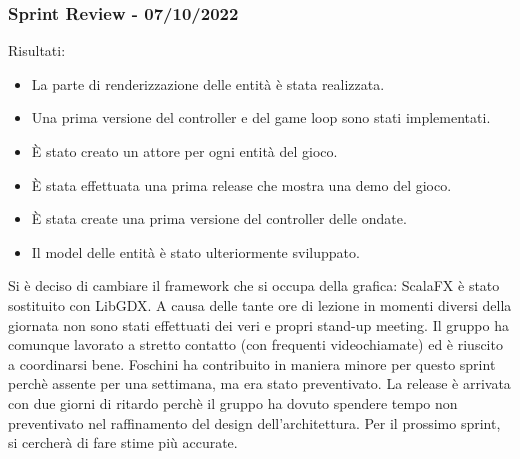 \subsubsection{Sprint Review - 07/10/2022}
Risultati:
\begin{itemize}
  \item La parte di renderizzazione delle entità è stata realizzata.
  \item Una prima versione del controller e del game loop sono stati implementati.
  \item È stato creato un attore per ogni entità del gioco.
  \item È stata effettuata una prima release che mostra una demo del gioco.
  \item È stata create una prima versione del controller delle ondate.
  \item Il model delle entità è stato ulteriormente sviluppato.
\end{itemize}

Si è deciso di cambiare il framework che si occupa della grafica: ScalaFX è stato sostituito con LibGDX.
A causa delle tante ore di lezione in momenti diversi della giornata non sono stati effettuati dei veri e propri stand-up meeting.
Il gruppo ha comunque lavorato a stretto contatto (con frequenti videochiamate) ed è riuscito a coordinarsi bene.
Foschini ha contribuito in maniera minore per questo sprint perchè assente per una settimana, ma era stato preventivato.
La release è arrivata con due giorni di ritardo perchè il gruppo ha dovuto spendere tempo non preventivato nel raffinamento del design dell'architettura.
Per il prossimo sprint, si cercherà di fare stime più accurate.